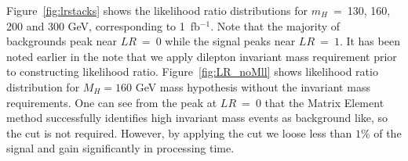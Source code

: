 \documentclass{cmspaper}
\begin{document}
Figure~\ref{fig:lrstacks} shows the likelihood ratio distributions for $m_H$~=~130, 160, 200 and 300 GeV,               
corresponding to 1~fb$^{-1}$. Note that the majority of backgrounds peak near $LR~=~0$ while the signal peaks near $LR~=~1$.  
It has been noted earlier in the note that we apply dilepton invariant mass requirement prior to constructing likelihood ratio. 
Figure~\ref{fig:LR_noMll} shows likelihood ratio distribution for $M_{H}=160$ GeV mass hypothesis without the invariant mass requirements.
One can see from the peak at $LR~=~0$ that the Matrix Element method successfully identifies high invariant mass events as background like, so the cut
is not required. However, by applying the cut we loose less than $1\%$ of the signal and gain significantly in processing time.

\begin{figure}[!hbtp]                                                                                         
\centering                                                                                                    

\end{figure}
\end{document}
